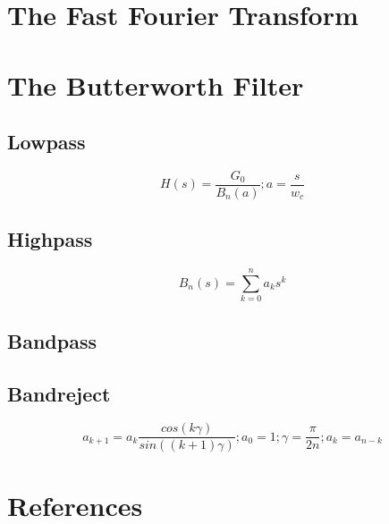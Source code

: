 \documentclass[american, twoside]{article}
\begin{document}
\section{The Fast Fourier Transform} \label{FFT}

\section{The Butterworth Filter} \label{Butterworth}
\subsection{Lowpass} \label{Butterworth:Lowpass}
\begin{equation} \label{butterworth:lowpass_generic}
    H(s) = \frac{G_{0}}{B_{n}(a)}; a = \frac{s}{w_{c}}
\end{equation}

\subsection{Highpass} \label{Butterworth:Highpass}
\begin{equation} \label{butterworth:polynomial}
    B_{n}(s) = \sum_{k = 0}^{n} a_{k}s^{k}
\end{equation}

\subsection{Bandpass} \label{Butterworth:Bandpass}
\subsection{Bandreject} \label{Butterworth:Bandreject}
\begin{equation} \label{butterowrth:coefficients}
    a_{k + 1} = a_{k}\frac{cos\left(k\gamma\right)}{sin((k + 1)\gamma)}; a_{0} = 1; \gamma = \frac{\pi}{2n}; a_{k} = a_{n - k}
\end{equation}

\section{References} \label{References}
\end{document}
